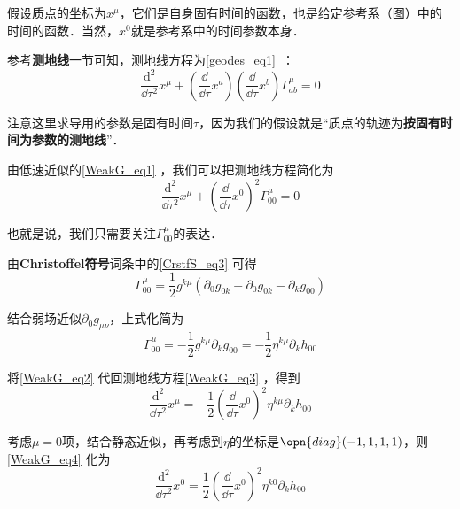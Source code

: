 假设质点的坐标为$x^\mu$，它们是自身固有时间的函数，也是给定参考系（图）中的时间的函数．当然，$x^0$就是参考系中的时间参数本身．

参考\textbf{测地线}一节可知，测地线方程为\autoref{geodes_eq1}~：
\begin{equation}
\frac{\mathrm{d}^2}{\dd\tau^2}x^\mu+(\frac{\dd}{\dd\tau}x^a)(\frac{\dd}{\dd\tau}x^b)\Gamma^\mu_{ab}=0
\end{equation}

注意这里求导用的参数是固有时间$\tau$，因为我们的假设就是“质点的轨迹为\textbf{按固有时间为参数的测地线}”．

由低速近似的\autoref{WeakG_eq1} ，我们可以把测地线方程简化为
\begin{equation}\label{WeakG_eq3}
\frac{\mathrm{d}^2}{\dd\tau^2}x^\mu+(\frac{\dd}{\dd\tau}x^0)^2\Gamma^\mu_{00}=0
\end{equation}

也就是说，我们只需要关注$\Gamma^\mu_{00}$的表达．

由\textbf{Christoffel符号}词条中的\autoref{CrstfS_eq3} 可得
\begin{equation}
\Gamma^\mu_{00}=\frac{1}{2}g^{k\mu}(\partial_0g_{0k}+\partial_0g_{0k}-\partial_{k}g_{00})
\end{equation}

结合弱场近似$\partial_0g_{\mu\nu}$，上式化简为
\begin{equation}\label{WeakG_eq2}
\Gamma^\mu_{00}=-\frac{1}{2}g^{k\mu}\partial_{k}g_{00}=-\frac{1}{2}\eta^{k\mu}\partial_{k}h_{00}
\end{equation}

将\autoref{WeakG_eq2} 代回测地线方程\autoref{WeakG_eq3} ，得到
\begin{equation}\label{WeakG_eq4}
\frac{\mathrm{d}^2}{\dd\tau^2}x^\mu=-\frac{1}{2}(\frac{\dd}{\dd\tau}x^0)^2\eta^{k\mu}\partial_{k}h_{00}
\end{equation}

考虑$\mu=0$项，结合静态近似，再考虑到$\eta$的坐标是$\opn{diag}(-1, 1, 1, 1)$，则\autoref{WeakG_eq4} 化为
\begin{equation}
\frac{\mathrm{d}^2}{\dd\tau^2}x^0=\frac{1}{2}(\frac{\dd}{\dd\tau}x^0)^2\eta^{k0}\partial_{k}h_{00}
\end{equation}

















